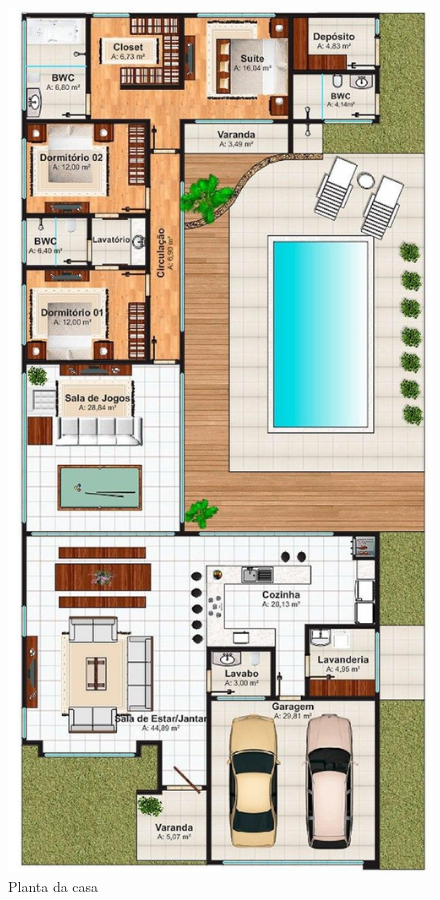 \begin{figure}[H]
  \begin{center}
	\includegraphics[keepaspectratio,scale=0.3,angle=90]{figuras/planta.eps}
	\caption{Planta da casa}
  \end{center}
\end{figure}


